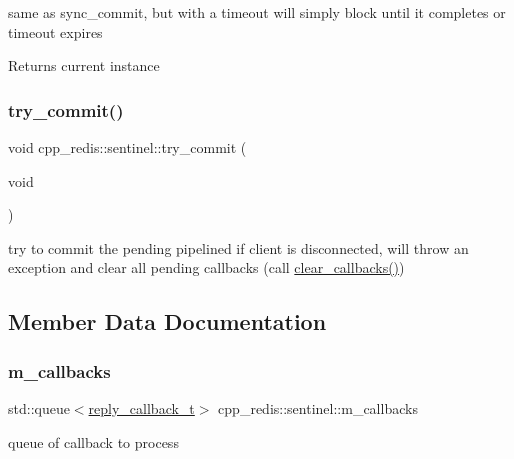 same as sync\+\_\+commit, but with a timeout will simply block until it completes or timeout expires

\begin{DoxyReturn}{Returns}
current instance 
\end{DoxyReturn}
\mbox{\label{classcpp__redis_1_1sentinel_ad27b6a3558e6d3a634df11dca80154df}} 
\subsubsection{\texorpdfstring{try\+\_\+commit()}{try\_commit()}}
{\footnotesize\ttfamily void cpp\+\_\+redis\+::sentinel\+::try\+\_\+commit (\begin{DoxyParamCaption}\item[{void}]{ }\end{DoxyParamCaption})\hspace{0.3cm}{\ttfamily [private]}}

try to commit the pending pipelined if client is disconnected, will throw an exception and clear all pending callbacks (call \hyperlink{classcpp__redis_1_1sentinel_a4f5364cf618fefe34ced591d698f5caf}{clear\+\_\+callbacks()}) 

\subsection{Member Data Documentation}
\mbox{\label{classcpp__redis_1_1sentinel_a12ce1c0a082ffdd718f0cc1d41d2339f}} 
\subsubsection{\texorpdfstring{m\+\_\+callbacks}{m\_callbacks}}
{\footnotesize\ttfamily std\+::queue$<$\hyperlink{classcpp__redis_1_1sentinel_ae1a150ff8787208c47414397a061c9a7}{reply\+\_\+callback\+\_\+t}$>$ cpp\+\_\+redis\+::sentinel\+::m\+\_\+callbacks\hspace{0.3cm}{\ttfamily [private]}}

queue of callback to process \mbox{\label{classcpp__redis_1_1sentinel_a65f034fd5c96887ffa36383dd264b250}} 
